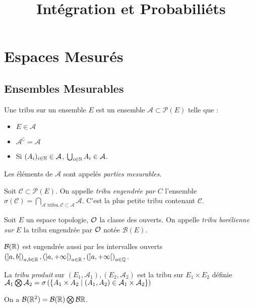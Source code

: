 \documentclass{cours}
\title{Intégration et Probabiliéts}
\begin{document}
\section{Espaces Mesurés}
    \subsection{Ensembles Mesurables}
    \begin{definition}
        Une tribu sur un ensemble $E$ est un ensemble $\mathcal{A} \subset \mathcal{P}(E)$ telle que :
        \begin{itemize}
            \item $E \in \mathcal{A}$
            \item $\mathcal{A}^{\complement} = \mathcal{A}$
            \item Si $(A_{i})_{i \in \mathbb{N}} \in \mathcal{A}$, $\bigcup_{i \in \mathbb{N}} A_{i} \in \mathcal{A}$.
        \end{itemize}
        Les éléments de $\mathcal{A}$ sont appelés \emph{parties mesurables}.
    \end{definition}

    \begin{definition}
        Soit $\mathcal{C} \subset \mathcal{P}(E)$. On appelle \emph{tribu engendrée par $C$} l'ensemble $\sigma(\mathcal{C}) = \bigcap_{\mathcal{A} \text{ tribu}, \mathcal{C} \subset \mathcal{A} } \mathcal{A}$. C'est la plus petite tribu contenant $\mathcal{C}$.
    \end{definition}

    \begin{definition}
        Soit $E$ un espace topologie, $\mathcal{O}$ la classe des ouverts. On appelle \emph{tribu borélienne sur} $E$ la tribu engendrée par $\mathcal{O}$ notée $\mathcal{B}(E)$.
    \end{definition}

    \begin{proposition}
        $\mathcal{B}(\mathbb{R})$ est engendrée aussi par les intervalles ouverts $\left(\left]a, b\right[\right)_{a, b \in \mathbb{R}}, \left(\left]a, +\infty\right[\right)_{a \in \mathbb{R}}, \left(\left]a, +\infty\right[\right)_{a \in \mathbb{Q}}$.
    \end{proposition}

    \begin{definition}
        La \emph{tribu produit} sur $(E_{1}, \mathcal{A}_{1}), (E_{2}, \mathcal{A}_{2})$ est la tribu sur $E_{1} \times E_{2}$ définie $\mathcal{A}_{1} \bigotimes \mathcal{A}_{2} = \sigma\left(\left\{A_{1}\times A_{2} \mid \left(A_{1}, A_{2}\right) \in \mathcal{A}_{1}\times \mathcal{A}_{2}\right\}\right)$
    \end{definition}
    \begin{proposition}
        On a $\mathcal{B}(\mathbb{R}^{2}) = \mathcal{B}(\mathbb{R}) \bigotimes \mathcal{B}{\mathbb{R}}$.
    \end{proposition}
\end{document}
